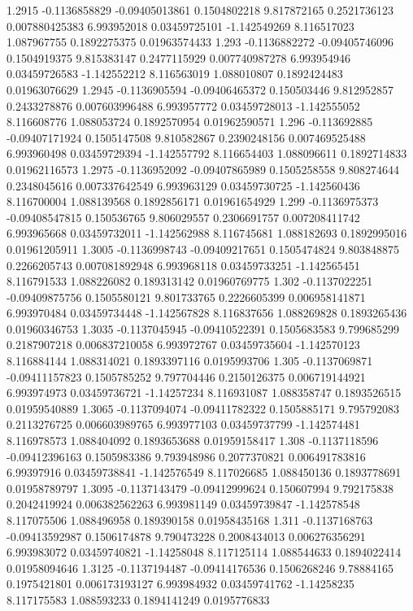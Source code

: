 {1.2915 -0.1136858829 -0.09405013861 0.1504802218 9.817872165 0.2521736123 0.007880425383 6.993952018 0.03459725101 -1.142549269 8.116517023 1.087967755 0.1892275375 0.01963574433
1.293 -0.1136882272 -0.09405746096 0.1504919375 9.815383147 0.2477115929 0.007740987278 6.993954946 0.03459726583 -1.142552212 8.116563019 1.088010807 0.1892424483 0.01963076629
1.2945 -0.1136905594 -0.09406465372 0.150503446 9.812952857 0.2433278876 0.007603996488 6.993957772 0.03459728013 -1.142555052 8.116608776 1.088053724 0.1892570954 0.01962590571
1.296 -0.113692885 -0.09407171924 0.1505147508 9.810582867 0.2390248156 0.007469525488 6.993960498 0.03459729394 -1.142557792 8.116654403 1.088096611 0.1892714833 0.01962116573
1.2975 -0.1136952092 -0.09407865989 0.1505258558 9.808274644 0.2348045616 0.007337642549 6.993963129 0.03459730725 -1.142560436 8.116700004 1.088139568 0.1892856171 0.01961654929
1.299 -0.1136975373 -0.09408547815 0.150536765 9.806029557 0.2306691757 0.007208411742 6.993965668 0.03459732011 -1.142562988 8.116745681 1.088182693 0.1892995016 0.01961205911
1.3005 -0.1136998743 -0.09409217651 0.1505474824 9.803848875 0.2266205743 0.007081892948 6.993968118 0.03459733251 -1.142565451 8.116791533 1.088226082 0.189313142 0.01960769775
1.302 -0.1137022251 -0.09409875756 0.1505580121 9.801733765 0.2226605399 0.006958141871 6.993970484 0.03459734448 -1.142567828 8.116837656 1.088269828 0.1893265436 0.01960346753
1.3035 -0.1137045945 -0.09410522391 0.1505683583 9.799685299 0.2187907218 0.006837210058 6.993972767 0.03459735604 -1.142570123 8.116884144 1.088314021 0.1893397116 0.0195993706
1.305 -0.1137069871 -0.09411157823 0.1505785252 9.797704446 0.2150126375 0.006719144921 6.993974973 0.03459736721 -1.14257234 8.116931087 1.088358747 0.1893526515 0.01959540889
1.3065 -0.1137094074 -0.09411782322 0.1505885171 9.795792083 0.2113276725 0.006603989765 6.993977103 0.03459737799 -1.142574481 8.116978573 1.088404092 0.1893653688 0.01959158417
1.308 -0.1137118596 -0.09412396163 0.1505983386 9.793948986 0.2077370821 0.006491783816 6.99397916 0.03459738841 -1.142576549 8.117026685 1.088450136 0.1893778691 0.01958789797
1.3095 -0.1137143479 -0.09412999624 0.150607994 9.792175838 0.2042419924 0.006382562263 6.993981149 0.03459739847 -1.142578548 8.117075506 1.088496958 0.189390158 0.01958435168
1.311 -0.1137168763 -0.09413592987 0.1506174878 9.790473228 0.2008434013 0.006276356291 6.993983072 0.03459740821 -1.14258048 8.117125114 1.088544633 0.1894022414 0.01958094646
1.3125 -0.1137194487 -0.09414176536 0.1506268246 9.78884165 0.1975421801 0.006173193127 6.993984932 0.03459741762 -1.14258235 8.117175583 1.088593233 0.1894141249 0.0195776833
}
